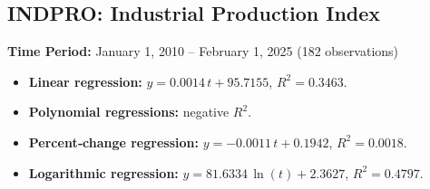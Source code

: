 \documentclass[11pt,a4paper]{article}
\begin{document}
\clearpage
\subsection{INDPRO: Industrial Production Index}
\textbf{Time Period:} January 1, 2010 – February 1, 2025 (182 observations)

\begin{itemize}
  \item \textbf{Linear regression:} \(y = 0.0014\,t + 95.7155\), \(R^2 = 0.3463\).
  \item \textbf{Polynomial regressions:} negative \(R^2\).
  \item \textbf{Percent‐change regression:} \(y = -0.0011\,t + 0.1942\), \(R^2 = 0.0018\).
  \item \textbf{Logarithmic regression:} \(y = 81.6334\,\ln(t) + 2.3627\), \(R^2 = 0.4797\).
\end{itemize}
\end{document}
